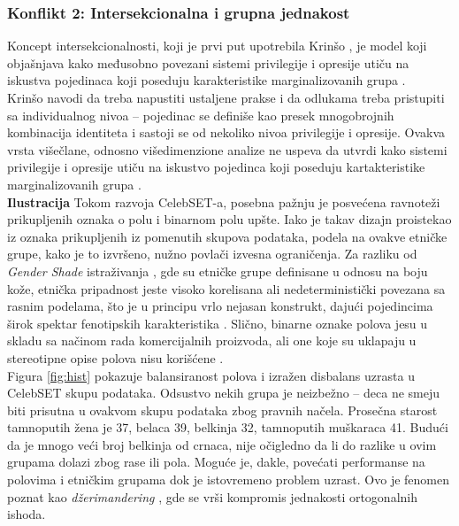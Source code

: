 \documentclass[11pt, a4paper]{article}
\begin{document}
\subsubsection{Konflikt 2: Intersekcionalna i grupna jednakost}
Koncept intersekcionalnosti, koji je prvi put upotrebila Krinšo \cite{G12}, je model koji objašnjava kako međusobno povezani sistemi privilegije i opresije utiču na iskustva pojedinaca koji poseduju karakteristike marginalizovanih grupa \cite{G13}. \\
\indent Krinšo navodi da treba napustiti ustaljene prakse i da odlukama treba pristupiti sa individualnog nivoa -- pojedinac se definiše kao presek mnogobrojnih kombinacija identiteta i sastoji se od nekoliko nivoa privilegije i opresije. Ovakva vrsta višečlane, odnosno višedimenzione analize ne uspeva da utvrdi kako sistemi privilegije i opresije utiču na iskustvo pojedinca koji poseduju kartakteristike marginalizovanih grupa \cite{G25}.\\
\indent \textbf{Ilustracija} Tokom razvoja CelebSET-a, posebna pažnju je posvećena ravnoteži prikupljenih oznaka o polu i binarnom polu upšte. Iako je takav dizajn proistekao iz oznaka prikupljenih iz pomenutih skupova podataka, podela na ovakve etničke grupe, kako je to izvršeno, nužno povlači izvesna ograničenja. Za razliku od \textit{Gender Shade} istraživanja \cite{G6}, gde su etničke grupe definisane u odnosu na boju kože, etnička pripadnost jeste visoko korelisana ali nedeterministički povezana sa rasnim podelama, što je u principu vrlo nejasan konstrukt, dajući pojedincima širok spektar fenotipskih karakteristika \cite{G3}. Slično, binarne oznake polova jesu u skladu sa načinom rada komercijalnih proizvoda, ali one koje su uklapaju u stereotipne opise polova nisu korišćene \cite{G29}. \\
\indent Figura \ref{fig:hist} pokazuje balansiranost polova i izražen disbalans uzrasta u CelebSET skupu podataka. Odsustvo nekih grupa je neizbežno -- deca ne smeju biti prisutna u ovakvom skupu podataka zbog pravnih načela. Prosečna starost tamnoputih žena je 37, belaca 39, belkinja 32, tamnoputih muškaraca 41. Budući da je mnogo veći broj belkinja od crnaca, nije očigledno da li do razlike u ovim grupama dolazi zbog rase ili pola. Moguće je, dakle, povećati performanse na polovima i etničkim grupama dok je istovremeno problem uzrast. Ovo je fenomen poznat kao \textit{džerimandering} \cite{G28}, gde se vrši kompromis jednakosti ortogonalnih ishoda.
\end{document}
